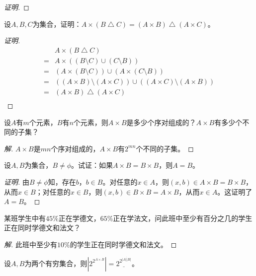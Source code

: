 \documentclass{article}
\begin{document}
\begin{CJK}{UTF8}{gbsn}
\begin{proof}[证明]
\end{proof}
\begin{Exercise}
  设$A,B,C$为集合，证明：$A\times(B\bigtriangleup C) = (A\times B)\bigtriangleup(A\times C)$。
\end{Exercise}
\begin{proof}[证明]
  \begin{align*}
    &A\times(B\bigtriangleup C)\\
    =&A\times((B\setminus C) \cup (C\setminus B))\\
    =&(A\times (B\setminus C)) \cup (A\times (C\setminus B))\\
    =&((A\times B)\setminus (A\times C)) \cup ((A\times C)\setminus (A\times B))\\
    =&(A\times B)\bigtriangleup(A\times C)\\
  \end{align*}
\end{proof}
\begin{Exercise}
  设$A$有$m$个元素，$B$有$n$个元素，则$A\times B$是多少个序对组成的？$A\times B$有多少个不同的子集？
\end{Exercise}
\begin{proof}[解]
  $A\times B$是$mn$个序对组成的，$A\times B$有$2^{mn}$个不同的子集。
\end{proof}
\begin{Exercise}
  设$A,B$为集合，$B\neq \phi$。试证：如果$A\times B= B\times B$，则$A=B$。
\end{Exercise}
\begin{proof}[证明]
  由$B\neq \phi$知，存在$b$，$b\in B$。对任意的$x\in A$，则$(x,b)\in A\times B=B\times B$，从而$x\in B$；对任意的$x\in B$，则$(x,b)\in B\times B = A\times B$，从而$x\in A$。这证明了$A=B$。
\end{proof}
\begin{Exercise}
  某班学生中有$45\%$正在学德文，$65\%$正在学法文，问此班中至少有百分之几的学生正在同时学德文和法文？
\end{Exercise}
\begin{proof}[解]
  此班中至少有$10\%$的学生正在同时学德文和法文。
\end{proof}
\begin{Exercise}
  设$A,B$为两个有穷集合，则$|2^{2^{A\times B}}|=\underline{2^{2^{|A|\dot|B|}}}$。
\end{Exercise}


\end{CJK}
\end{document}
